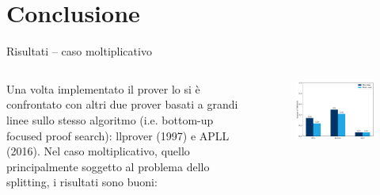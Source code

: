 \documentclass{beamer}
\begin{document}
\section{Conclusione}
\begin{frame}{Risultati -- caso moltiplicativo}
	\begin{columns}
		\begin{column}{.5\textwidth}
	Una volta implementato il prover lo si è confrontato con altri due prover basati a grandi linee sullo stesso algoritmo (i.e. bottom-up focused proof search): llprover (1997) e APLL (2016).
	Nel caso moltiplicativo, quello principalmente soggetto al problema dello splitting, i risultati sono buoni:
		\end{column}
		\begin{column}{.5\textwidth}
			\begin{figure}[H]
				\centering
				\includegraphics[scale=.4]{images/graph}
			\end{figure}
		\end{column}
	\end{columns}
\end{frame}
\end{document}
